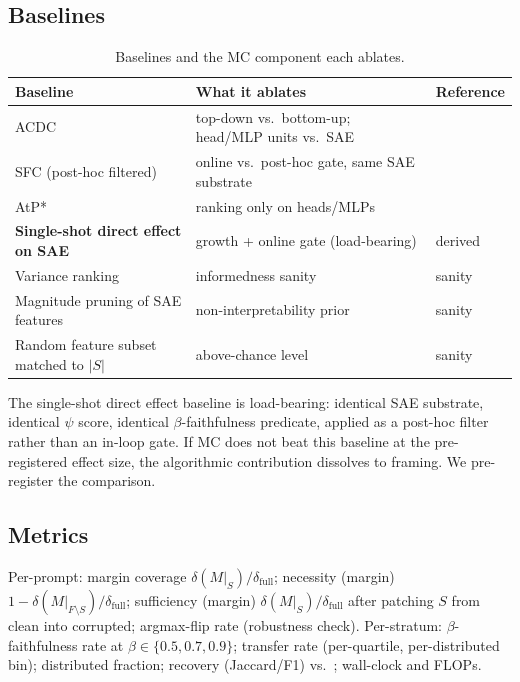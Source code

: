 \documentclass[10pt]{article}
\begin{document}
\subsection{Baselines}

\begin{table}[t]
\centering
\small
\caption{Baselines and the MC component each ablates.}
\label{tab:baselines}
\begin{tabular}{@{}p{4.4cm}p{6.5cm}p{2.0cm}@{}}
\toprule
Baseline & What it ablates & Reference \\
\midrule
ACDC & top-down vs.\ bottom-up; head/MLP units vs.\ SAE & \citet{conmy2023acdc} \\
SFC (post-hoc filtered) & online vs.\ post-hoc gate, same SAE substrate & \citet{marks2024sparse} \\
AtP* & ranking only on heads/MLPs & \citet{kramar2024atp,syed2024attribution} \\
\textbf{Single-shot direct effect on SAE} & growth + online gate (load-bearing) & derived \\
Variance ranking & informedness sanity & sanity \\
Magnitude pruning of SAE features & non-interpretability prior & sanity \\
Random feature subset matched to $|S|$ & above-chance level & sanity \\
\bottomrule
\end{tabular}
\end{table}

The single-shot direct effect baseline is load-bearing: identical SAE substrate, identical $\psi$ score, identical $\beta$-faithfulness predicate, applied as a post-hoc filter rather than an in-loop gate. If MC does not beat this baseline at the pre-registered effect size, the algorithmic contribution dissolves to framing. We pre-register the comparison.

\subsection{Metrics}

Per-prompt: margin coverage $\delta(M|_S)/\delta_{\text{full}}$; necessity (margin) $1 - \delta(M|_{F\setminus S})/\delta_{\text{full}}$; sufficiency (margin) $\delta(M|_S)/\delta_{\text{full}}$ after patching $S$ from clean into corrupted; argmax-flip rate (robustness check). Per-stratum: $\beta$-faithfulness rate at $\beta \in \{0.5, 0.7, 0.9\}$; transfer rate (per-quartile, per-distributed bin); distributed fraction; recovery (Jaccard/F1) vs.\ \citet{wang2022interpretability,hanna2023greater}; wall-clock and FLOPs.
\end{document}
